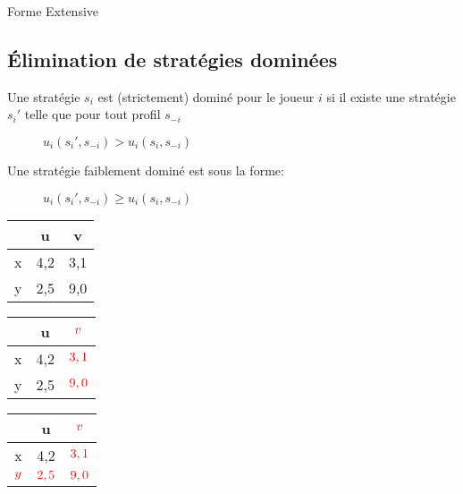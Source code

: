 \begin{center}
\end{center}
\begin{center}
Forme Extensive
\end{center}

\pagebreak
\subsection{Élimination de stratégies dominées}

Une stratégie $s_i$ est (strictement) dominé pour le joueur $i$ si il existe une stratégie $s_i'$ telle que pour tout profil $s_{-i}$ 
\begin{description}
\item[] $u_i(s_i', s_{-i}) > u_i ( s_i, s_{-i})$
\end{description}

Une stratégie faiblement dominé est sous la forme:
\begin{description}
\item[] $u_i(s_i', s_{-i}) \geq u_i ( s_i, s_{-i})$
\end{description}

\begin{multicols}{3}
[]
\begin{tabular}{c|cc}
$ $ & u & v\\
\hline
x & 4,2 & 3,1\\
y & 2,5 & 9,0\\
\end{tabular}

\begin{tabular}{c|cc}
$ $ & u & $\textcolor{red}{v}$\\
\hline
x & 4,2 & $\textcolor{red}{3,1}$\\
y & 2,5 & $\textcolor{red}{9,0}$\\
\end{tabular}

\begin{tabular}{c|cc}
$ $ & u & $\textcolor{red}{v}$\\
\hline
x & 4,2 & $\textcolor{red}{3,1}$\\
$\textcolor{red}{y}$ & $\textcolor{red}{2,5}$ & $\textcolor{red}{9,0}$\\
\end{tabular}
\end{multicols}

